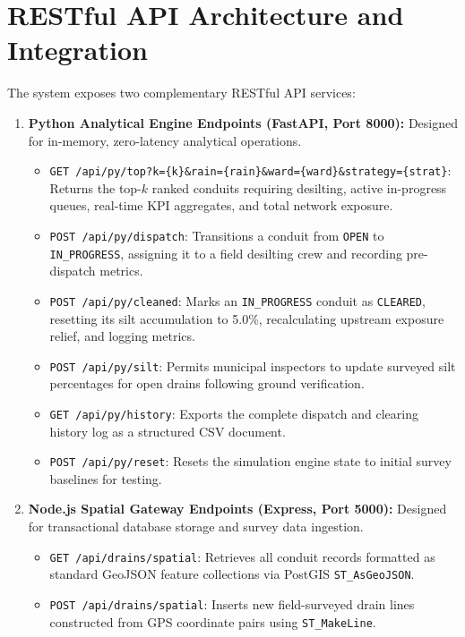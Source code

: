 \documentclass[12pt,a4paper]{report}
\begin{document}
\section{RESTful API Architecture and Integration}
The system exposes two complementary RESTful API services:
\begin{enumerate}
    \item \textbf{Python Analytical Engine Endpoints (FastAPI, Port 8000):} Designed for in-memory, zero-latency analytical operations.
    \begin{itemize}
        \item \texttt{GET /api/py/top?k=\{k\}\&rain=\{rain\}\&ward=\{ward\}\&strategy=\{strat\}}: Returns the top-$k$ ranked conduits requiring desilting, active in-progress queues, real-time KPI aggregates, and total network exposure.
        \item \texttt{POST /api/py/dispatch}: Transitions a conduit from \texttt{OPEN} to \texttt{IN\_PROGRESS}, assigning it to a field desilting crew and recording pre-dispatch metrics.
        \item \texttt{POST /api/py/cleaned}: Marks an \texttt{IN\_PROGRESS} conduit as \texttt{CLEARED}, resetting its silt accumulation to 5.0\%, recalculating upstream exposure relief, and logging metrics.
        \item \texttt{POST /api/py/silt}: Permits municipal inspectors to update surveyed silt percentages for open drains following ground verification.
        \item \texttt{GET /api/py/history}: Exports the complete dispatch and clearing history log as a structured CSV document.
        \item \texttt{POST /api/py/reset}: Resets the simulation engine state to initial survey baselines for testing.
    \end{itemize}
    \item \textbf{Node.js Spatial Gateway Endpoints (Express, Port 5000):} Designed for transactional database storage and survey data ingestion.
    \begin{itemize}
        \item \texttt{GET /api/drains/spatial}: Retrieves all conduit records formatted as standard GeoJSON feature collections via PostGIS \texttt{ST\_AsGeoJSON}.
        \item \texttt{POST /api/drains/spatial}: Inserts new field-surveyed drain lines constructed from GPS coordinate pairs using \texttt{ST\_MakeLine}.
    \end{itemize}
\end{enumerate}
\end{document}
